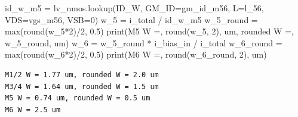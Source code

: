 \documentclass[
  a4paper,
  DIV=11,
  numbers=noendperiod]{scrartcl}
\newenvironment{Shaded}{\begin{snugshade}}{\end{snugshade}}
\newcommand{\BuiltInTok}[1]{\textcolor[rgb]{0.00,0.23,0.31}{#1}}
\newcommand{\DecValTok}[1]{\textcolor[rgb]{0.68,0.00,0.00}{#1}}
\newcommand{\FloatTok}[1]{\textcolor[rgb]{0.68,0.00,0.00}{#1}}
\newcommand{\NormalTok}[1]{\textcolor[rgb]{0.00,0.23,0.31}{#1}}
\newcommand{\OperatorTok}[1]{\textcolor[rgb]{0.37,0.37,0.37}{#1}}
\newcommand{\StringTok}[1]{\textcolor[rgb]{0.13,0.47,0.30}{#1}}
\begin{document}
\begin{tcolorbox}
\begin{Shaded}
\begin{Highlighting}[]
\NormalTok{id\_w\_m5 }\OperatorTok{=}\NormalTok{ lv\_nmos.lookup(}\StringTok{\textquotesingle{}ID\_W\textquotesingle{}}\NormalTok{, GM\_ID}\OperatorTok{=}\NormalTok{gm\_id\_m56, L}\OperatorTok{=}\NormalTok{l\_56, VDS}\OperatorTok{=}\NormalTok{vgs\_m56, VSB}\OperatorTok{=}\DecValTok{0}\NormalTok{)}
\NormalTok{w\_5 }\OperatorTok{=}\NormalTok{ i\_total }\OperatorTok{/}\NormalTok{ id\_w\_m5}
\NormalTok{w\_5\_round }\OperatorTok{=} \BuiltInTok{max}\NormalTok{(}\BuiltInTok{round}\NormalTok{(w\_5}\OperatorTok{*}\DecValTok{2}\NormalTok{)}\OperatorTok{/}\DecValTok{2}\NormalTok{, }\FloatTok{0.5}\NormalTok{)}
\BuiltInTok{print}\NormalTok{(}\StringTok{\textquotesingle{}M5 W =\textquotesingle{}}\NormalTok{, }\BuiltInTok{round}\NormalTok{(w\_5, }\DecValTok{2}\NormalTok{), }\StringTok{\textquotesingle{}um, rounded W =\textquotesingle{}}\NormalTok{, w\_5\_round, }\StringTok{\textquotesingle{}um\textquotesingle{}}\NormalTok{)}
\NormalTok{w\_6 }\OperatorTok{=}\NormalTok{ w\_5\_round }\OperatorTok{*}\NormalTok{ i\_bias\_in }\OperatorTok{/}\NormalTok{ i\_total}
\NormalTok{w\_6\_round }\OperatorTok{=} \BuiltInTok{max}\NormalTok{(}\BuiltInTok{round}\NormalTok{(w\_6}\OperatorTok{*}\DecValTok{2}\NormalTok{)}\OperatorTok{/}\DecValTok{2}\NormalTok{, }\FloatTok{0.5}\NormalTok{)}
\BuiltInTok{print}\NormalTok{(}\StringTok{\textquotesingle{}M6 W =\textquotesingle{}}\NormalTok{, }\BuiltInTok{round}\NormalTok{(w\_6\_round, }\DecValTok{2}\NormalTok{), }\StringTok{\textquotesingle{}um\textquotesingle{}}\NormalTok{)}
\end{Highlighting}
\end{Shaded}

\begin{verbatim}
M1/2 W = 1.77 um, rounded W = 2.0 um
M3/4 W = 1.64 um, rounded W = 1.5 um
M5 W = 0.74 um, rounded W = 0.5 um
M6 W = 2.5 um
\end{verbatim}


\end{tcolorbox}
\end{document}
